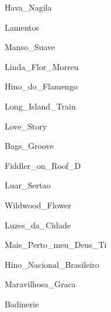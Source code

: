 \documentclass{scrartcl}
\begin{document}

{Hava_Nagila}


{Lamentos}


{Manso_Suave}


{Linda_Flor_Morreu}


{Hino_do_Flamengo}


{Long_Island_Train}


{Love_Story}


{Bags_Groove}


{Fiddler_on_Roof_D}


{Luar_Sertao}


{Wildwood_Flower}


{Luzes_da_Cidade}


{Mais_Perto_meu_Deus_Ti}


{Hino_Nacional_Brasileiro}


{Maravilhosa_Graca}


{Badinerie}
\end{document}
